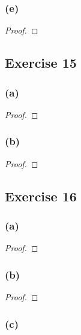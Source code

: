 \documentclass[14pt]{extarticle}
\begin{document}
\subsubsection{(e)}

\begin{proof}

\end{proof}

\subsection{Exercise 15}

\subsubsection{(a)}

\begin{proof}

\end{proof}

\subsubsection{(b)}

\begin{proof}

\end{proof}

\subsection{Exercise 16}

\subsubsection{(a)}

\begin{proof}

\end{proof}

\subsubsection{(b)}

\begin{proof}

\end{proof}

\subsubsection{(c)}
\end{document}
